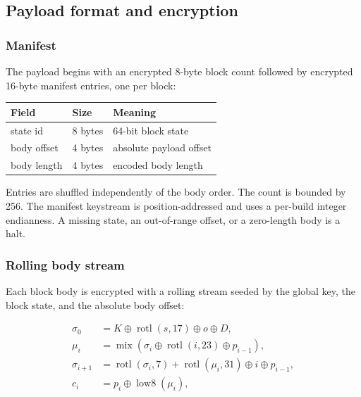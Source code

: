 \subsection{Payload format and encryption}

\subsubsection{Manifest}

The payload begins with an encrypted 8-byte block count followed by encrypted
16-byte manifest entries, one per block:

\begin{center}
\small
\begin{tabular}{@{}lll@{}}
\toprule
Field & Size & Meaning \\
\midrule
state id & 8 bytes & 64-bit block state \\
body offset & 4 bytes & absolute payload offset \\
body length & 4 bytes & encoded body length \\
\bottomrule
\end{tabular}
\end{center}

Entries are shuffled independently of the body order. The count is bounded by
256. The manifest keystream is position-addressed and uses a per-build integer
endianness. A missing state, an out-of-range offset, or a zero-length body is a
 halt.

\subsubsection{Rolling body stream}

Each block body is encrypted with a rolling stream seeded by the global key, the
block state, and the absolute body offset:

\begin{align}
  \sigma_0 &= K \oplus \operatorname{rotl}(s,17) \oplus o \oplus D, \label{eq:body-seed}\\
  \mu_i &= \operatorname{mix}\!\left(\sigma_i \oplus \operatorname{rotl}(i,23) \oplus p_{i-1}\right), \label{eq:body-mix}\\
  \sigma_{i+1} &= \operatorname{rotl}(\sigma_i,7) + \operatorname{rotl}(\mu_i,31)
                  \oplus i \oplus p_{i-1}, \label{eq:body-state}\\
  c_i &= p_i \oplus \operatorname{low8}(\mu_i), \label{eq:body-cipher}
\end{align}

